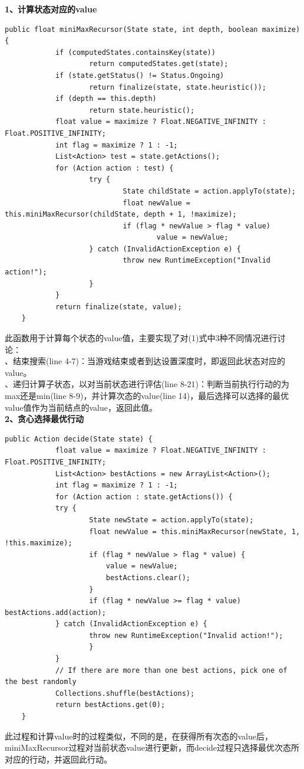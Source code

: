 \documentclass[UTF8]{article}
\begin{document}
	\indent\textbf{1、计算状态对应的value}
	\begin{lstlisting}[caption=计算每个状态对应的value]
	public float miniMaxRecursor(State state, int depth, boolean maximize) {
			if (computedStates.containsKey(state)) 
					return computedStates.get(state);
			if (state.getStatus() != Status.Ongoing)
					return finalize(state, state.heuristic());
			if (depth == this.depth)
					return state.heuristic();
			float value = maximize ? Float.NEGATIVE_INFINITY : Float.POSITIVE_INFINITY;
			int flag = maximize ? 1 : -1;
			List<Action> test = state.getActions();
			for (Action action : test) {
					try {
							State childState = action.applyTo(state);
							float newValue = this.miniMaxRecursor(childState, depth + 1, !maximize);
							if (flag * newValue > flag * value) 
						  			value = newValue;
					} catch (InvalidActionException e) {
							throw new RuntimeException("Invalid action!");
					}
			}
			return finalize(state, value);
	}
	\end{lstlisting}
	\indent 此函数用于计算每个状态的value值，主要实现了对(1)式中3种不同情况进行讨论：\\
	、结束搜索(line 4-7)：当游戏结束或者到达设置深度时，即返回此状态对应的value。\\
	、递归计算子状态，以对当前状态进行评估(line 8-21)：判断当前执行行动的为max还是min(line 8-9)，并计算次态的value(line 14)，最后选择可以选择的最优value值作为当前结点的value，返回此值。\\
	\indent\textbf{2、贪心选择最优行动}
	\begin{lstlisting}[caption=贪心选取最优行动]
	public Action decide(State state) {
			float value = maximize ? Float.NEGATIVE_INFINITY : Float.POSITIVE_INFINITY;
			List<Action> bestActions = new ArrayList<Action>();
			int flag = maximize ? 1 : -1;
			for (Action action : state.getActions()) {
			try {
					State newState = action.applyTo(state);
					float newValue = this.miniMaxRecursor(newState, 1, !this.maximize);
					if (flag * newValue > flag * value) {
						value = newValue;
						bestActions.clear();
					}
					if (flag * newValue >= flag * value) bestActions.add(action);
			} catch (InvalidActionException e) {
					throw new RuntimeException("Invalid action!");
					}
			}
			// If there are more than one best actions, pick one of the best randomly
			Collections.shuffle(bestActions);
			return bestActions.get(0);
	}
	\end{lstlisting}
	
\indent 此过程和计算value时的过程类似，不同的是，在获得所有次态的value后，miniMaxRecursor过程对当前状态value进行更新，而decide过程只选择最优次态所对应的行动，并返回此行动。
	
\end{document}
